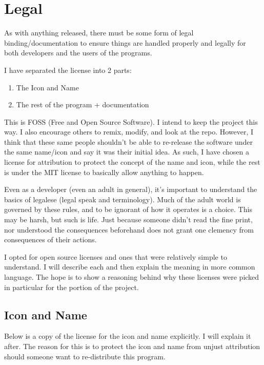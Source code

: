 \section{Legal}

As with anything released, there must be some form of legal
binding/documentation to ensure things are handled properly and
legally for both developers and the users of the programs.

I have separated the license into 2 parts:

\begin{enumerate}
	\item The Icon and Name
	\item The rest of the program + documentation
\end{enumerate}

This is FOSS (Free and Open Source Software). I intend to keep the project
this way. I also encourage others to remix, modify, and
look at the repo. However, I think that these same people shouldn't be
able to re-release the software under the same name/icon and say it
was their initial idea. As such, I have chosen a license for
attribution to protect the concept of the name and icon, while the
rest is under the
MIT license to basically allow anything to happen.

Even as a developer (even an adult in general), it's important to
understand the basics of legalese (legal speak and terminology).
Much of the adult world is governed by these rules, and to be
ignorant of how it operates is a choice. This may be harsh, but such is
life. Just because someone didn't read the fine print, nor understood the
consequences beforehand does not grant one clemency from consequences
of their actions.

I opted for open source licenses and ones that were relatively simple
to understand. I will describe each and then explain the meaning in
more common language. The hope is to show a reasoning behind why
these licenses were picked in particular for the portion of the project.

\subsection{Icon and Name}

Below is a copy of the license for the icon and name explicitly. I
will explain it after. The reason for this is to protect the icon and
name from unjust attribution should someone want to re-distribute this program.

